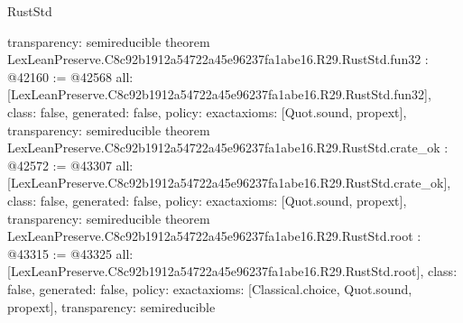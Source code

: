 \begin{lexlean}{RustStd}
\begin{coremodule}
{  transparency: semireducible
}
theorem LexLeanPreserve.C8c92b1912a54722a45e96237fa1abe16.R29.RustStd.fun32 : @42160 := @42568 {
  all: [LexLeanPreserve.C8c92b1912a54722a45e96237fa1abe16.R29.RustStd.fun32],
  class: false,
  generated: false,
  policy: exact{axioms: [Quot.sound, propext]},
  transparency: semireducible
}
theorem LexLeanPreserve.C8c92b1912a54722a45e96237fa1abe16.R29.RustStd.crate_ok : @42572 := @43307 {
  all: [LexLeanPreserve.C8c92b1912a54722a45e96237fa1abe16.R29.RustStd.crate_ok],
  class: false,
  generated: false,
  policy: exact{axioms: [Quot.sound, propext]},
  transparency: semireducible
}
theorem LexLeanPreserve.C8c92b1912a54722a45e96237fa1abe16.R29.RustStd.root : @43315 := @43325 {
  all: [LexLeanPreserve.C8c92b1912a54722a45e96237fa1abe16.R29.RustStd.root],
  class: false,
  generated: false,
  policy: exact{axioms: [Classical.choice, Quot.sound, propext]},
  transparency: semireducible
}


\end{coremodule}
\end{lexlean}

